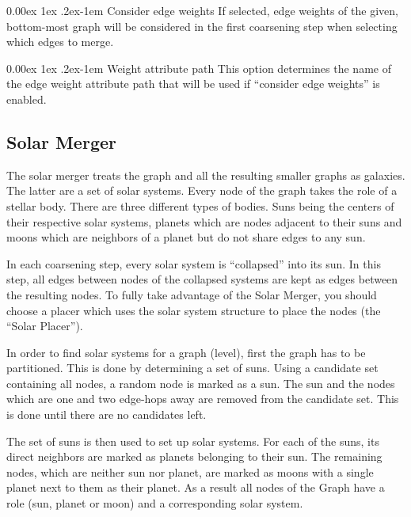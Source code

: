 \documentclass{tufte-handout}
\makeatletter
\renewcommand{\paragraph}{%
  \@startsection{paragraph}{4}%
  {\z@}{0.00ex \@plus 1ex \@minus .2ex}{-1em}%
  {\normalfont\normalsize\bfseries}%
}
\makeatother
\begin{document}
  \paragraph{Consider edge weights} If selected, edge weights of the given,
  bottom-most graph will be considered in the first coarsening step when
  selecting which edges to merge.

  \paragraph{Weight attribute path} This option determines the name of the edge
  weight attribute path that will be used if ``consider edge weights'' is
  enabled.

  \subsection{Solar Merger}
  The solar merger treats the graph and all the resulting smaller graphs as galaxies. The
  latter are a set of solar systems. Every node of the graph takes the role of a stellar body.
  There are three different types of bodies. Suns being the centers of their respective solar
  systems, planets which are nodes adjacent to their suns and moons which are neighbors of
  a planet but do not share edges to any sun.

  In each coarsening step, every solar system is “collapsed” into its sun. In this step, all
  edges between nodes of the collapsed systems are kept as edges between the resulting
  nodes. To fully take advantage of the Solar Merger, you should choose a placer which uses
  the solar system structure to place the nodes (the “Solar Placer”).

  In order to find solar systems for a graph (level), first the graph has to be
  partitioned. This is done by determining a set of suns. Using a candidate set
  containing all nodes, a random node is marked as a sun. The sun and the nodes
  which are one and two edge-hops away are removed from the candidate set. This is
  done until there are no candidates left.

  The set of suns is then used to set up solar systems. For each of the suns,
  its direct neighbors are marked as planets belonging to their sun. The remaining
  nodes, which are neither sun nor planet, are marked as moons with a single
  planet next to them as their planet. As a result all nodes of the Graph have a
  role (sun, planet or moon) and a corresponding solar system.
\end{document}
